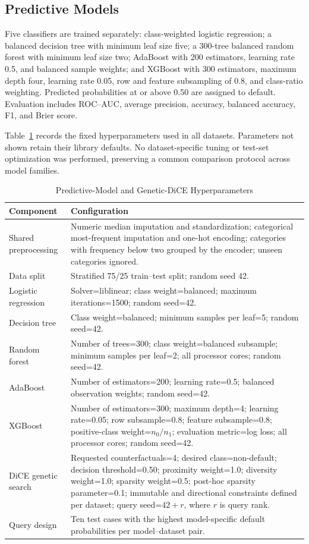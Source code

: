 \documentclass[conference]{IEEEtran}
\begin{document}
\subsection{Predictive Models}
Five classifiers are trained separately: class-weighted logistic regression; a balanced decision tree with minimum leaf size five; a 300-tree balanced random forest \cite{breiman2001random} with minimum leaf size two; AdaBoost \cite{freund1997adaboost} with 200 estimators, learning rate 0.5, and balanced sample weights; and XGBoost \cite{chen2016xgboost} with 300 estimators, maximum depth four, learning rate 0.05, row and feature subsampling of 0.8, and class-ratio weighting. Predicted probabilities at or above 0.50 are assigned to default. Evaluation includes ROC--AUC, average precision, accuracy, balanced accuracy, F1, and Brier score.

Table~\ref{tab:hyperparameters} records the fixed hyperparameters used in all datasets. Parameters not shown retain their library defaults. No dataset-specific tuning or test-set optimization was performed, preserving a common comparison protocol across model families.

\begin{table}[t]
\caption{Predictive-Model and Genetic-DiCE Hyperparameters}
\label{tab:hyperparameters}
\centering\scriptsize
\begin{tabular}{p{2.7cm}p{12.8cm}}
\toprule
Component & Configuration \\
\midrule
Shared preprocessing & Numeric median imputation and standardization; categorical most-frequent imputation and one-hot encoding; categories with frequency below two grouped by the encoder; unseen categories ignored. \\
Data split & Stratified 75/25 train--test split; random seed 42. \\
Logistic regression & Solver=liblinear; class weight=balanced; maximum iterations=1500; random seed=42. \\
Decision tree & Class weight=balanced; minimum samples per leaf=5; random seed=42. \\
Random forest & Number of trees=300; class weight=balanced subsample; minimum samples per leaf=2; all processor cores; random seed=42. \\
AdaBoost & Number of estimators=200; learning rate=0.5; balanced observation weights; random seed=42. \\
XGBoost & Number of estimators=300; maximum depth=4; learning rate=0.05; row subsample=0.8; feature subsample=0.8; positive-class weight=$n_0/n_1$; evaluation metric=log loss; all processor cores; random seed=42. \\
DiCE genetic search & Requested counterfactuals=4; desired class=non-default; decision threshold=0.50; proximity weight=1.0; diversity weight=1.0; sparsity weight=0.5; post-hoc sparsity parameter=0.1; immutable and directional constraints defined per dataset; query seed=$42+r$, where $r$ is query rank. \\
Query design & Ten test cases with the highest model-specific default probabilities per model--dataset pair. \\
\bottomrule
\end{tabular}
\end{table}
\end{document}

